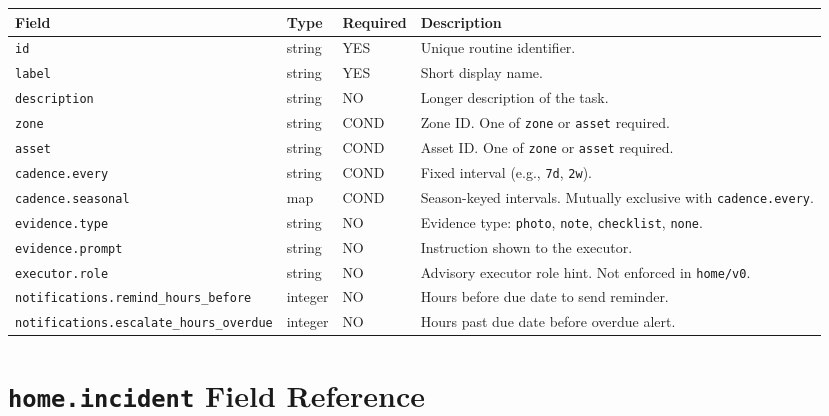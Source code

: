 \begin{center}
\small
\begin{tabular}{lllp{5.5cm}}
\textbf{Field} & \textbf{Type} & \textbf{Required} & \textbf{Description} \\
\hline
\texttt{id} & string & YES & Unique routine identifier. \\
\texttt{label} & string & YES & Short display name. \\
\texttt{description} & string & NO & Longer description of the task. \\
\texttt{zone} & string & COND & Zone ID. One of \texttt{zone} or \texttt{asset} required. \\
\texttt{asset} & string & COND & Asset ID. One of \texttt{zone} or \texttt{asset} required. \\
\texttt{cadence.every} & string & COND & Fixed interval (e.g., \texttt{7d}, \texttt{2w}). \\
\texttt{cadence.seasonal} & map & COND & Season-keyed intervals. Mutually exclusive with \texttt{cadence.every}. \\
\texttt{evidence.type} & string & NO & Evidence type: \texttt{photo}, \texttt{note}, \texttt{checklist}, \texttt{none}. \\
\texttt{evidence.prompt} & string & NO & Instruction shown to the executor. \\
\texttt{executor.role} & string & NO & Advisory executor role hint. Not enforced in \texttt{home/v0}. \\
\texttt{notifications.remind\_hours\_before} & integer & NO & Hours before due date to send reminder. \\
\texttt{notifications.escalate\_hours\_overdue} & integer & NO & Hours past due date before overdue alert. \\
\end{tabular}
\end{center}

\section{\texttt{home.incident} Field Reference}
\label{sec:ref-incident-fields}

